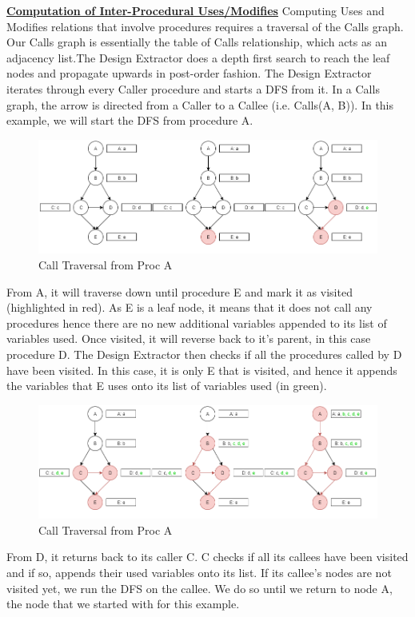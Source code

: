 \documentclass[12pt]{article}
\begin{document}
{{{{{{{{{{{{{\textbf{\underline{Computation of Inter-Procedural Uses/Modifies}}\newline
Computing Uses and Modifies relations that involve procedures requires a traversal of the Calls graph. Our Calls graph is essentially the table of Calls relationship, which acts as an adjacency list.The Design Extractor does a depth first search to reach the leaf nodes and propagate upwards in post-order fashion.
The Design Extractor iterates through every Caller procedure and starts a DFS from it. In a Calls graph, the arrow is directed from a Caller to a Callee (i.e. Calls(A, B)). 
\newline In this example, we will start the DFS from procedure A. 
\begin{figure}[h]
  \caption{Call Traversal from Proc A}
  \centering  \includegraphics[width=1.0\textwidth]{Call_Traversal.png}
\end{figure}
\vspace{4mm} \newline
From A, it will traverse down until procedure E and mark it as visited (highlighted in red). As E is a leaf node, it means that it does not call any procedures hence there are no new additional variables appended to its list of variables used. Once visited, it will reverse back to it’s parent, in this case procedure D. The Design Extractor then checks if all the procedures called by D have been visited. In this case, it is only E that is visited, and hence it appends the variables that E uses onto its list of variables used (in green).
\begin{figure}[h]
  \caption{Call Traversal from Proc A}
  \centering   \includegraphics[width=1.0\textwidth]{Call_Traversal_2.png}
\end{figure}
\newline From D, it returns back to its caller C. C checks if all its callees have been visited and if so, appends their used variables onto its list. If its callee’s nodes are not visited yet, we run the DFS on the callee. We do so until we return to node A, the node that we started with for this example.

}}}}}}}}}}}}}
\end{document}
